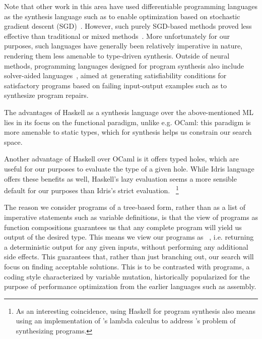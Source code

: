 \documentclass{article}
\begin{document}
Note that other work in this area have used differentiable programming languages
as the synthesis language such as to enable optimization based on
stochastic gradient descent (SGD)~\citep{forth,terpret}.
However, such purely SGD-based methods proved less effective than traditional or mixed methods~\citep{terpret}.
More unfortunately for our purposes, such languages have generally been relatively imperative in nature,
rendering them less amenable to type-driven synthesis.
Outside of neural methods, programming languages designed for program synthesis also include solver-aided languages~\citep{rosette},
aimed at generating satisfiability conditions for satisfactory programs based on failing input-output examples such as to synthesize program repairs.

The advantages of Haskell as a synthesis language over the above-mentioned ML lies in its focus on the functional paradigm,
unlike e.g. OCaml: this paradigm is more amenable to static types, which for synthesis helps us constrain our search space.

Another advantage of Haskell over OCaml is it offers typed holes, which are useful for our purposes to evaluate the type of a given hole.
While Idris language offers these benefits as well, Haskell's lazy evaluation seems a more sensible default for our purposes than Idris's strict evaluation.
~\footnote{As an interesting coincidence, using Haskell for program synthesis also means using an implementation of \citet{lambdacalculus}'s lambda calculus to address \citet{church1957applications}'s problem of synthesizing programs.}

The reason we consider programs of a tree-based form, rather than as a list of imperative statements such as variable definitions,
is that the view of programs as function compositions guarantees us that any complete program will yield us output of the desired type.
This means we view our programs as ~\citep{fortran95},
i.e. returning a deterministic output for any given inputs, without performing any additional side effects.
This guarantees that, rather than just branching out, our search will focus on finding acceptable solutions.
This is to be contrasted with  programs, a coding style characterized by variable mutation,
historically popularized for the purpose of performance optimization from the earlier languages such as assembly.
\end{document}
